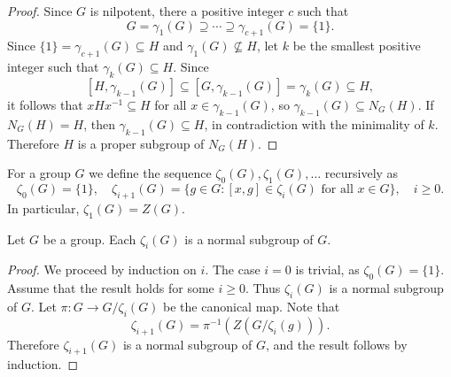 \begin{proof}
	Since $G$ is nilpotent, there a positive integer $c$ such that 
	\[
	G=\gamma_1(G)\supseteq\cdots\supseteq\gamma_{c+1}(G)=\{1\}.
	\]
	Since 
	$\{1\}=\gamma_{c+1}(G)\subseteq H$ and $\gamma_1(G)\not\subseteq H$, 
	let $k$ be the smallest positive integer such that $\gamma_k(G)\subseteq H$. Since 
	\[
		[H,\gamma_{k-1}(G)]\subseteq [G,\gamma_{k-1}(G)]=\gamma_k(G)\subseteq H,
	\]
	it follows that 
	$xHx^{-1}\subseteq H$ for all $x\in\gamma_{k-1}(G)$,
	so  $\gamma_{k-1}(G)\subseteq N_G(H)$. If $N_G(H)=H$, then 
	$\gamma_{k-1}(G)\subseteq H$, in contradiction with the minimality of $k$. Therefore
	$H$ is a proper subgroup of $N_G(H)$.
\end{proof}



For a group $G$ we define the sequence $\zeta_0(G),\zeta_1(G),\dots$
recursively as 
\[
	\zeta_0(G)=\{1\},\quad
	\zeta_{i+1}(G)=\{g\in G:[x,g]\in\zeta_{i}(G)\text{ for all $x\in G$}\},\quad i\geq 0.
\]
In particular, $\zeta_1(G)=Z(G)$.

\begin{lemma}
	\label{lem:central_ascendente}
	Let $G$ be a group. Each $\zeta_i(G)$ is a normal
	subgroup of $G$. 
\end{lemma}

\begin{proof}
	We proceed by induction on $i$. The case $i=0$ is trivial, as 
	$\zeta_0(G)=\{1\}$.  Assume that the result holds for some $i\geq0$. Thus $\zeta_i(G)$ is a normal subgroup of $G$.
	Let $\pi\colon G\rightarrow G/\zeta_i(G)$ be the canonical map. Note that
	\[ \zeta_{i+1}(G)=\pi^{-1}(Z(G/\zeta_i(g))).\]
	Therefore $\zeta_{i+1}(G)$ is a normal subgroup of $G$, and the result follows by induction.
%	
%	
\end{proof}


